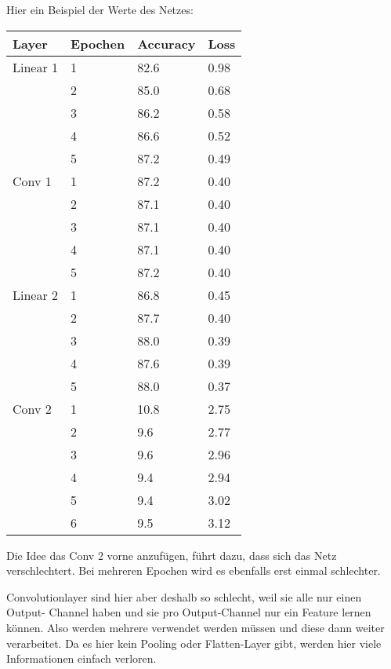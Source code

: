     Hier ein Beispiel der Werte des Netzes:

    \begin{table}[h!]
        \begin{tabular}{l|l|l|l}
            Layer & Epochen & Accuracy & Loss \\
            \hline
            Linear 1 & 1 & 82.6 & 0.98 \\
            & 2 & 85.0 & 0.68 \\
            & 3 & 86.2 & 0.58 \\
            & 4 & 86.6 & 0.52 \\
            & 5 & 87.2 & 0.49\\
            Conv 1 & 1 & 87.2 & 0.40 \\
            & 2 & 87.1 & 0.40 \\
            & 3 & 87.1 & 0.40 \\
            & 4 & 87.1 & 0.40 \\
            & 5 & 87.2 & 0.40 \\
            Linear 2 & 1 & 86.8 & 0.45 \\
            & 2 & 87.7 & 0.40 \\
            & 3 & 88.0 & 0.39 \\
            & 4 & 87.6 & 0.39 \\
            & 5 & 88.0 & 0.37 \\
            Conv 2 & 1 & 10.8 & 2.75 \\
            & 2 & 9.6 & 2.77 \\
            & 3 & 9.6 & 2.96 \\
            & 4 & 9.4 & 2.94 \\
            & 5 & 9.4 & 3.02 \\
            & 6 & 9.5 & 3.12 \\
        \end{tabular}
    \end{table}

    Die Idee das Conv 2 vorne anzufügen, führt dazu, dass sich das Netz verschlechtert. 
    Bei mehreren Epochen wird es ebenfalls erst einmal schlechter.


    Convolutionlayer sind hier aber deshalb so schlecht, weil sie alle nur einen Output-
    Channel haben und sie pro Output-Channel nur ein Feature lernen können.
    Also werden mehrere verwendet werden müssen und diese dann weiter verarbeitet. 
    Da es hier kein Pooling oder Flatten-Layer gibt, werden hier viele Informationen 
    einfach verloren.

